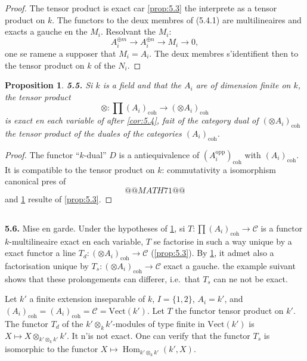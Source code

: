 \documentclass[12pt,a4paper]{article}
\theoremstyle{plain}
\newtheorem{proposition}[theorem]{Proposition}
\theoremstyle{definition}
\theoremstyle{remark}
\DeclareMathOperator{\Hom}{Hom}
\begin{document}
\begin{proof}
The tensor product is exact car \ref{prop:5.3} the interprete as a tensor product on $k$. The functors to the deux membres of (5.4.1) are multilineaires and exacts a gauche en the $M_i$. Resolvant the $M_i$:
\[
A_i^{\oplus m} \to A_i^{\oplus n} \to M_i \to 0,
\]
one se ramene a supposer that $M_i = A_i$. The deux membres s'identifient then to the tensor product on $k$ of the $N_i$.
\end{proof}

\begin{proposition}\label{prop:5.5}
\textbf{5.5.} Si $k$ is a field and that the $A_i$ are of dimension finite on $k$, the tensor product
\[
\otimes : \prod (A_i)_\mathrm{coh} \to (\otimes A_i)_\mathrm{coh}
\]
is exact en each variable of after \ref{cor:5.4}, fait of the category dual of $(\otimes A_i)_\mathrm{coh}$ the tensor product of the duales of the categories $(A_i)_\mathrm{coh}$.
\end{proposition}

\begin{proof}
The functor ``$k$-dual'' $D$ is a antiequivalence of $(A_i^\mathrm{opp})_\mathrm{coh}$ with $(A_i)_\mathrm{coh}$. It is compatible to the tensor product on $k$: commutativity a isomorphism canonical pres of
\[
@@MATH71@@
\]
and \ref{prop:5.5} resulte of \ref{prop:5.3}.
\end{proof}

\subsection{}

\textbf{5.6.} Mise en garde. Under the hypotheses of \ref{prop:5.5}, si $T : \prod (A_i)_\mathrm{coh} \to \mathcal{C}$ is a functor $k$-multilineaire exact en each variable, $T$ se factorise in such a way unique by a exact functor a line $T_d : (\otimes A_i)_\mathrm{coh} \to \mathcal{C}$ (\ref{prop:5.3}). By \ref{prop:5.5}, it admet also a factorisation unique by $T_s : (\otimes A_i)_\mathrm{coh} \to \mathcal{C}$ exact a gauche. the example suivant shows that these prolongements can differer, i.e.~that $T_s$ can ne not be exact.

Let $k'$ a finite extension inseparable of $k$, $I = \{1,2\}$, $A_i = k'$, and $(A_i)_\mathrm{coh} = (A_i)_\mathrm{coh} = \mathcal{C} = \mathrm{Vect}(k')$. Let $T$ the functor tensor product on $k'$. The functor $T_d$ of the $k' \otimes_k k'$-modules of type finite in $\mathrm{Vect}(k')$ is $X \mapsto X \otimes_{k' \otimes_k k'} k'$. It n'is not exact. One can verify that the functor $T_s$ is isomorphic to the functor $X \mapsto \Hom_{k' \otimes_k k'}(k', X)$.
\end{document}

